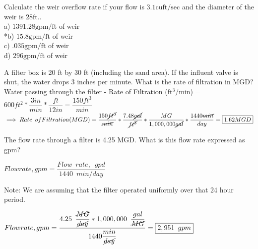 \documentclass{article}
\begin{document}
\begin{enumerate}
{  \item Calculate the weir overflow rate if your flow is $3.1 \mathrm{cuft} / \mathrm{sec}$ and the diameter of the weir is $28 \mathrm{ft}$..\\
a) $1391.28 \mathrm{gpm} / \mathrm{ft}$ of weir\\
*b) $15.8 \mathrm{gpm} / \mathrm{ft}$ of weir\\
c) $.035 \mathrm{gpm} / \mathrm{ft}$ of weir\\
d) $296 \mathrm{gpm} / \mathrm{ft}$ of weir\\

\item A filter box is 20 ft by 30 ft (including the sand area). If the influent valve is shut, the water drops 3 inches per minute. What is the rate of filtration in MGD?\\
\vspace{0.2cm}
Water passing through the filter - Rate of Filtration (ft$^3$/min) = $600ft^2*\dfrac{3in}{min}*\dfrac{ft}{12in}=\dfrac{150ft^3}{min}$\\
\vspace{0.2cm}
$\implies Rate \enspace of Filtration(MGD)=\dfrac{150\cancel{ft^3}}{\cancel{min}}*\dfrac{7.48\cancel{gal}}{\cancel{ft^3}}*\dfrac{MG}{1,000,000\cancel{gal}}*\dfrac{1440\cancel{min}}{day}=\boxed{1.62MGD}$


 

 

\item The flow rate through a filter is 4.25 MGD. What is this flow rate expressed as gpm?\\

\vspace{0.2cm}

$Flow rate, gpm=\dfrac{Flow \enspace rate, \enspace gpd}{1440 \enspace min/day}$\\

\vspace{0.2cm}

Note:  We are assuming that the filter operated uniformly over that 24 hour period.\\

\vspace{0.3cm}

$Flow rate, gpm=\dfrac{4.25 \enspace \dfrac{\cancel{MG}}{\cancel{day}} *1,000,000 \enspace \dfrac{gal}{\cancel{MG}}}{1440\dfrac{min}{\cancel{day}}}=\boxed{2,951 \enspace gpm}$

 

\vspace{0.3cm}

}
\end{enumerate}
\end{document}
